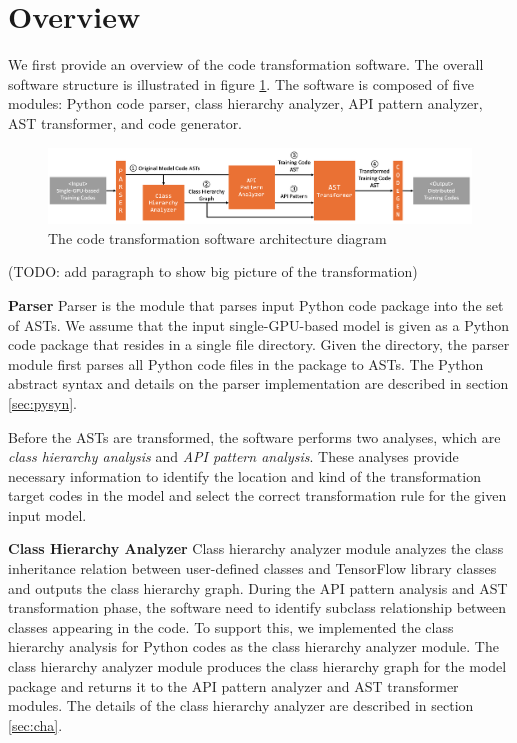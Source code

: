 \section{Overview}

We first provide an overview of the code transformation software.
The overall software structure is illustrated in figure \ref{sysarch}.
The software is composed of five modules: Python code parser,
class hierarchy analyzer, API pattern analyzer, AST transformer,
and code generator.

\begin{figure}[h]
  \includegraphics[width=1\textwidth]{system_arch}
  \caption{The code transformation software architecture diagram}
  \label{sysarch}
\end{figure}

(TODO: add paragraph to show big picture of the transformation)

\textbf{Parser}
Parser is the module that parses input Python code package
into the set of ASTs.
We assume that the input single-GPU-based model is given as a Python code
package that resides in a single file directory.
Given the directory, the parser module first parses all Python code files
in the package to ASTs.
The Python abstract syntax and details on the parser implementation
are described in section \ref{sec:pysyn}.

Before the ASTs are transformed, the software performs two analyses, 
which are \textit{class hierarchy analysis} and 
\textit{API pattern analysis}.
These analyses provide necessary information to identify the
location and kind of the transformation target codes in the model
and select the correct transformation rule for the given input model.

\textbf{Class Hierarchy Analyzer}
Class hierarchy analyzer module analyzes the class inheritance relation
between user-defined classes and TensorFlow library classes and
outputs the class hierarchy graph.
During the API pattern analysis and AST transformation phase,
the software need to identify subclass relationship between
classes appearing in the code.
To support this, we implemented the class hierarchy analysis
for Python codes as the class hierarchy analyzer module.
The class hierarchy analyzer module produces the class hierarchy graph
for the model package and returns it to the API pattern analyzer and 
AST transformer modules. The details of the class hierarchy analyzer are
described in section \ref{sec:cha}.

